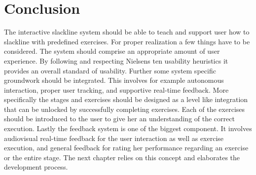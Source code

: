 \section{Conclusion}\label{4_7_conclusion}
The interactive slackline system should be able to teach and support user how to slackline with predefined exercises. For proper realization a few things have to be considered. The system should comprise an appropriate amount of user experience. By following and respecting Nielsens ten usability heuristics it provides an overall standard of usability. Further some system specific groundwork should be integrated. This involves for example autonomous interaction, proper user tracking, and supportive real-time feedback. More specifically the stages and exercises should be designed as a level like integration that can be unlocked by successfully completing exercises. Each of the exercises should be introduced to the user to give her an understanding of the correct execution. Lastly the feedback system is one of the biggest component. It involves audiovisual real-time feedback for the user interaction as well as exercise execution, and general feedback for rating her performance regarding an exercise or the entire stage. The next chapter \textit{} relies on this concept and elaborates the development process.
